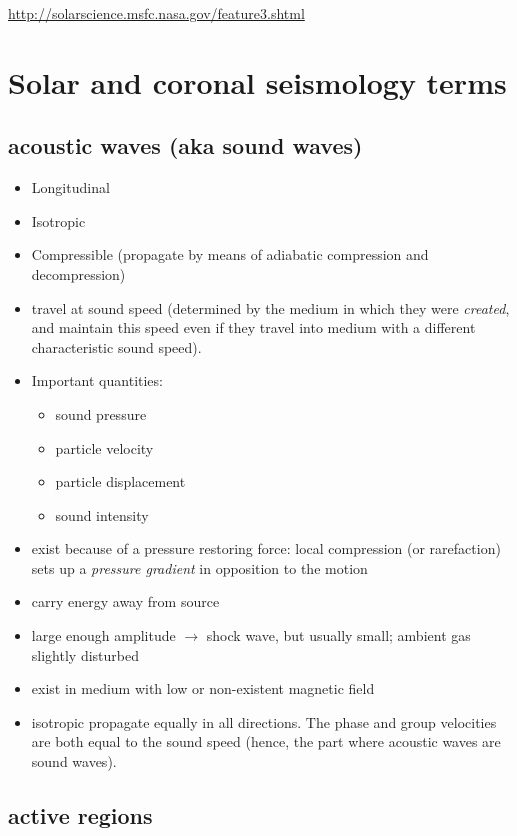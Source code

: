 \documentclass{article}
\begin{document}
\tableofcontents
\url{http://solarscience.msfc.nasa.gov/feature3.shtml}
\newpage

\section{Solar and coronal seismology terms}
\subsection{acoustic waves (aka sound waves)}
\begin{itemize}
    \item Longitudinal
    \item Isotropic
    \item Compressible (propagate by means of adiabatic
        compression and decompression)
    \item travel at sound speed (determined by the medium in which
        they were \emph{created}, and maintain this speed even if they
        travel into medium with a different characteristic sound speed).
    \item Important quantities:
        \begin{itemize}
            \item sound pressure
            \item particle velocity
            \item particle displacement
            \item sound intensity
        \end{itemize}
    \item exist because of a pressure restoring force: local compression
        (or rarefaction) sets up a \emph{pressure gradient} in opposition
        to the motion
    \item carry energy away from source
    \item large enough amplitude $\rightarrow$ shock wave,
        but usually small; ambient gas slightly disturbed
    \item exist in medium with low or non-existent magnetic field
    \item isotropic \- propagate equally in all directions. The phase
        and group velocities are both equal to the sound speed (hence, the
        part where acoustic waves are sound waves).
\end{itemize}

\subsection{active regions}
\end{document}
